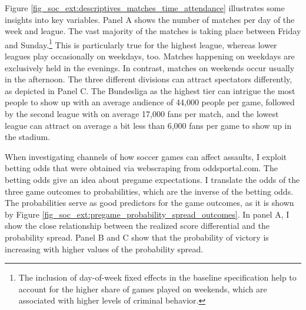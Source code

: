 \documentclass[11pt, a4paper]{article} %
\begin{document}

Figure \ref{fig_soc_ext:descriptives_matches_time_attendance} illustrates some insights into key variables. Panel A shows the number of matches per day of the week and league. The vast majority of the matches is taking place between Friday and Sunday.\footnote{The inclusion of day-of-week fixed effects in the baseline specification help to account for the higher share of games played on weekends, which are associated with higher levels of criminal behavior.} This is particularly true for the highest league, whereas lower leagues play occasionally on weekdays, too. Matches happening on weekdays are exclusively held in the evenings. In contrast, matches on weekends occur usually in the afternoon. The three different divisions can attract spectators differently, as depicted in Panel C. The Bundesliga as the highest tier can intrigue the most people to show up with an average audience of 44,000 people per game, followed by the second league with on average 17,000 fans per match, and the lowest league can attract on average a bit less than 6,000 fans per game to show up in the stadium.

When investigating channels of how soccer games can affect assaults, I exploit betting odds that were obtained via webscraping from oddsportal.com. The betting odds give an idea about pregame expectations. I translate the odds of the three game outcomes to probabilities, which are the inverse of the betting odds. The probabilities serve as good predictors for the game outcomes, as it is shown by Figure \ref{fig_soc_ext:pregame_probability_spread_outcomes}. In panel A, I show the close relationship between the realized score differential and the probability spread. Panel B and C show that the probability of victory is increasing with higher values of the probability spread. 
\end{document}
